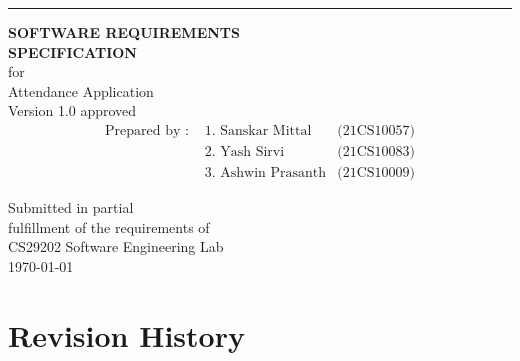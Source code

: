 \documentclass{scrreprt}
\date{}
\def\myversion{1.0 }
\begin{document}
\thispagestyle{empty}
\begin{flushright}
    \rule{16cm}{5pt}\vskip1cm
    \begin{bfseries}
        \Huge\textbf{SOFTWARE REQUIREMENTS\\ SPECIFICATION}\\
        \vspace{1cm}
        for\\
        \vspace{1cm}
        Attendance Application\\
        \vspace{1cm}
        \LARGE{Version \myversion approved}\\
        \vspace{1cm}
        \begin{align*}
        \text{Prepared by : } 
        &\text{1. Sanskar Mittal} &\text{(21CS10057)}\\
        &\text{2. Yash Sirvi} &\text{(21CS10083)}\\
        &\text{3. Ashwin Prasanth} &\text{(21CS10009)}
        \end{align*}

        \vspace{1cm}
        Submitted in partial \\fulfillment of the requirements of \\CS29202 Software Engineering Lab\\
        \vspace{1cm}
        \today\\
    \end{bfseries}
\end{flushright}
\renewcommand*\contentsname{Table of Contents}


\tableofcontents
{}

\newcommand{\addappendix}{%
  \chapter*{\appendixname}%
  \addcontentsline{toc}{chapter}{\appendixname}%
  \counterwithin*{figure}{section}%
  \renewcommand{\thesection}{A}%
  \renewcommand{\thefigure}%
}

\chapter*{Revision History}
\end{document}

